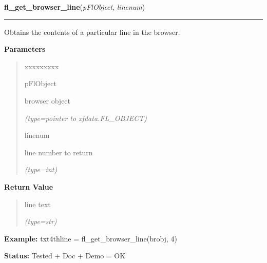     \vspace{0.5ex}

\hspace{.8\funcindent}\begin{boxedminipage}{\funcwidth}

    \raggedright \textbf{fl\_get\_browser\_line}(\textit{pFlObject}, \textit{linenum})

    \vspace{-1.5ex}

    \rule{\textwidth}{0.5\fboxrule}
\setlength{\parskip}{2ex}
    Obtains the contents of a particular line in the browser.

\setlength{\parskip}{1ex}
      \textbf{Parameters}
      \vspace{-1ex}

      \begin{quote}
        \begin{Ventry}{xxxxxxxxx}

          \item[pFlObject]

          browser object

            {\it (type=pointer to xfdata.FL\_OBJECT)}

          \item[linenum]

          line number to return

            {\it (type=int)}

        \end{Ventry}

      \end{quote}

      \textbf{Return Value}
    \vspace{-1ex}

      \begin{quote}
      line text

      {\it (type=str)}

      \end{quote}

\textbf{Example:} txt4thline = fl\_get\_browser\_line(brobj, 4)



\textbf{Status:} Tested + Doc + Demo = OK



    \end{boxedminipage}

    \label{xformslib:flbrowser:fl_load_browser}

